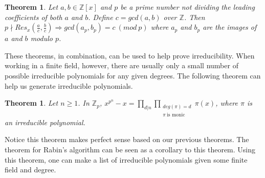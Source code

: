\documentclass{article}
\newtheorem*{Definition: Sylvester Matrix}{Definition}
\newtheorem*{Definition: Resultant 1}{Definition 1}
\newtheorem*{Definition: Resultant 2}{Definition 2}
\newtheorem*{Theorem: Resultant proves shared roots}{Theorem 1}
\newtheorem*{Theorem: Minimal polynomial for beta}{Theorem 2}
\newtheorem*{Example: Sylvester Matrix Ex}{Example}
\newtheorem*{Theorem: Roots}{Theorem}
\newtheorem*{Corollary: Discriminant}{Corollary}
\newtheorem*{Theorem: Rational Root Theorem}{Theorem}
\newtheorem*{Corollary: Cubic Irreducibility}{Corollary}
\newtheorem*{Theorem: Eisenstein Criterion}{Theorem}
\newtheorem*{Theorem: mod p Test}{Theorem}
\newtheorem*{Theorem: Rabin's algorithm}{Theorem}
\newtheorem*{Theorem: gcd finite field}{Theorem}
\newtheorem*{Theorem: Gauss Irreducibles}{Theorem}
\newtheorem*{Theorem: Number of irreducibles}{Theorem}
\newtheorem*{Example: All irreducibles in Z_2}{Example}
\newtheorem*{Formula: Minimal polynomial for r root of a}{Formula 1}
\newtheorem*{Example: minimal polynomial for sqrt(p)}{Example}
\newtheorem*{Example: Golden Ratio}{Example}
\newtheorem*{Formula: Minimal polynomial for a+b}{Formula 2}
\newtheorem*{Example: 1 + sqrt(3)}{Example}
\newtheorem*{Example: cubic root of unity}{Example}
\newtheorem*{Formula: Minimal polynomial for a/b}{Formula 3}
\newtheorem*{Formula: Minimal polynomial for ab}{Formula 4}
\newtheorem*{Example: cubrt(4)/i+1}{Example}
\newtheorem*{Example: 5zeta}{Example}
\newtheorem*{Example: Wild one}{Example}
\begin{document}
\begin{Theorem: gcd finite field}
Let $a, b \in \mathbb{Z}[x]$ and $p$ be a prime number not dividing the leading coefficients of both $a$ and $b$. Define $c=gcd(a,b)$ over $\mathbb{Z}$. Then $p \nmid Res_x(\frac{a}{c}, \frac{b}{c}) \Rightarrow gcd(a_p, b_p)=c \ (mod \ p)$ where $a_p$ and $b_p$ are the images of $a$ and $b$ modulo $p$. \cite{Franz Winkler}
\end{Theorem: gcd finite field}

These theorems, in combination, can be used to help prove irreducibility. When working in a finite field, however, there are usually only a small number of possible irreducible polynomials for any given degrees. The following theorem can help us generate irreducible polynomials.

\begin{Theorem: Gauss Irreducibles}
Let $n \geq 1$. In $\mathbb{Z}_p$, $x^{p^n}-x= \displaystyle \prod_{d|n} \prod_{\substack{deg(\pi)=d \\ \pi \ \text{is monic}}} \pi(x)$, where $\pi$ is an irreducible polynomial. \cite{kconrad Roots and Irreducibles}
\end{Theorem: Gauss Irreducibles}

Notice this theorem makes perfect sense based on our previous theorems. The theorem for Rabin's algorithm can be seen as a corollary to this theorem. Using this theorem, one can make a list of irreducible polynomials given some finite field and degree. 
\end{document}

